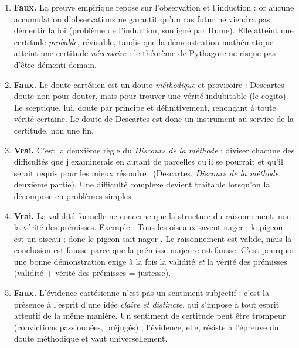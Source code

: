 \documentclass[11pt]{article}
\newcommand{\cle}[1]{{\popxbold\color{popdark}#1}}
\begin{document}
\begin{corrige}
\begin{enumerate}
\item \textbf{Faux.} La \cle{preuve empirique} repose sur l'observation et l'\cle{induction} : or aucune accumulation d'observations ne garantit qu'un cas futur ne viendra pas démentir la loi (problème de l'induction, souligné par Hume). Elle atteint une certitude \emph{probable}, \cle{révisable}, tandis que la \cle{démonstration mathématique} atteint une certitude \emph{nécessaire} : le théorème de Pythagore ne risque pas d'être démenti demain.
\item \textbf{Faux.} Le \cle{doute cartésien} est un doute \emph{méthodique} et provisoire : Descartes doute non pour douter, mais pour trouver une vérité indubitable (le \cle{cogito}). Le \cle{sceptique}, lui, doute par principe et définitivement, renonçant à toute vérité certaine. Le doute de Descartes est donc un instrument au service de la certitude, non une fin.
\item \textbf{Vrai.} C'est la deuxième règle du \emph{Discours de la méthode} : \guillemotleft diviser chacune des difficultés que j'examinerais en autant de parcelles qu'il se pourrait et qu'il serait requis pour les mieux résoudre \guillemotright\ (Descartes, \emph{Discours de la méthode}, deuxième partie). Une difficulté complexe devient traitable lorsqu'on la décompose en problèmes simples.
\item \textbf{Vrai.} La \cle{validité formelle} ne concerne que la structure du raisonnement, non la vérité des prémisses. Exemple : \guillemotleft Tous les oiseaux savent nager ; le pigeon est un oiseau ; donc le pigeon sait nager \guillemotright. Le raisonnement est valide, mais la conclusion est fausse parce que la prémisse majeure est fausse. C'est pourquoi une bonne démonstration exige à la fois la validité \emph{et} la vérité des prémisses (\cle{validité} + \cle{vérité des prémisses} = \cle{justesse}).
\item \textbf{Faux.} L'\cle{évidence cartésienne} n'est pas un sentiment subjectif : c'est la présence à l'esprit d'une idée \emph{claire et distincte}, qui s'impose à tout esprit attentif de la même manière. Un sentiment de certitude peut être trompeur (convictions passionnées, préjugés) ; l'évidence, elle, résiste à l'épreuve du doute méthodique et vaut \cle{universellement}.
\end{enumerate}
\end{corrige}
\end{document}
